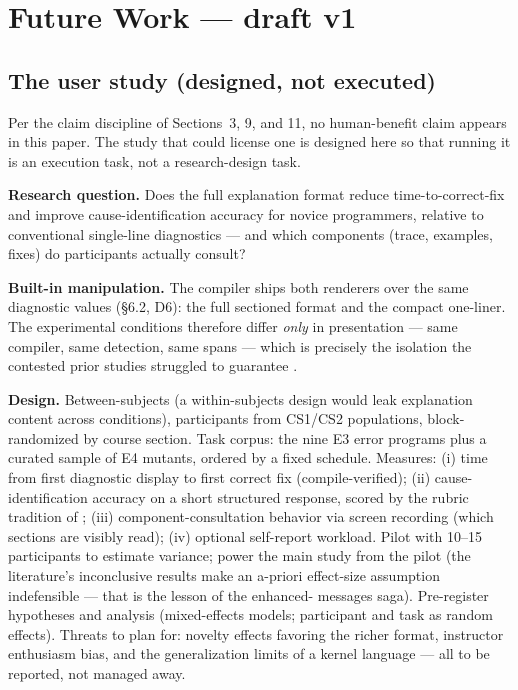 \section{Future Work --- draft v1}
\label{sec:future}

\subsection{The user study (designed, not executed)}

Per the claim discipline of Sections~3, 9, and 11, no human-benefit claim
appears in this paper. The study that could license one is designed
here so that running it is an execution task, not a research-design
task.

\textbf{Research question.} Does the full explanation format reduce
time-to-correct-fix and improve cause-identification accuracy for
novice programmers, relative to conventional single-line
diagnostics --- and which components (trace, examples, fixes) do
participants actually consult?

\textbf{Built-in manipulation.} The compiler ships both renderers over
the same diagnostic values (\S6.2, D6): the full sectioned format and
the compact one-liner. The experimental conditions therefore differ
\emph{only} in presentation --- same compiler, same detection, same spans ---
which is precisely the isolation the contested prior studies
struggled to guarantee \cite{denny2014enhancing,pettit2017enhanced}.

\textbf{Design.} Between-subjects (a within-subjects design would leak
explanation content across conditions), participants from CS1/CS2
populations, block-randomized by course section. Task corpus: the
nine E3 error programs plus a curated sample of E4 mutants, ordered
by a fixed schedule. Measures: (i) time from first diagnostic
display to first correct fix (compile-verified); (ii) cause-
identification accuracy on a short structured response, scored by
the rubric tradition of \cite{marceau2011measuring}; (iii) component-consultation behavior
via screen recording (which sections are visibly read); (iv)
optional self-report workload. Pilot with 10--15 participants to
estimate variance; power the main study from the pilot (the
literature's inconclusive results \cite{pettit2017enhanced} make an a-priori effect-size
assumption indefensible --- that is the lesson of the enhanced-
messages saga). Pre-register hypotheses and analysis (mixed-effects
models; participant and task as random effects). Threats to plan
for: novelty effects favoring the richer format, instructor
enthusiasm bias, and the generalization limits of a kernel language
--- all to be reported, not managed away.

